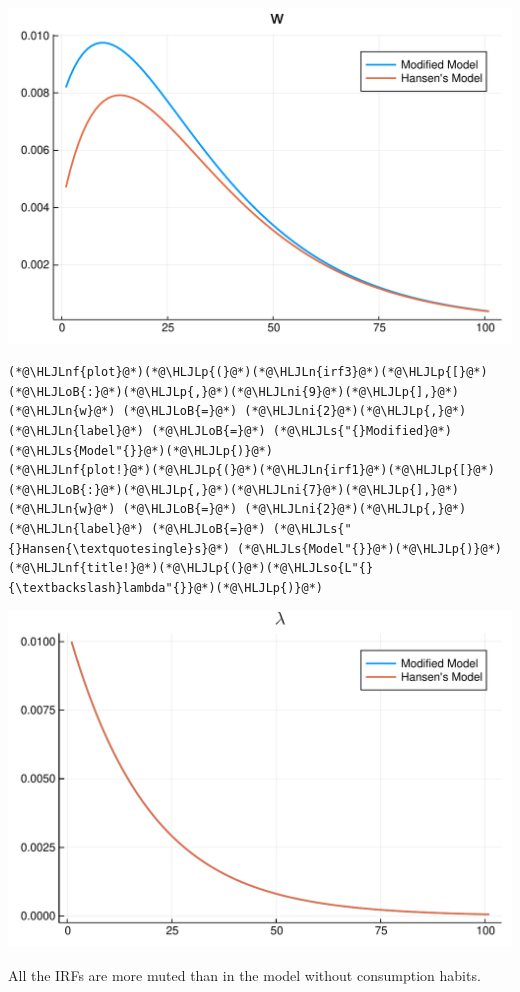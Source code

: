 \documentclass[12pt,a4paper]{article}
\newcommand{\HLJLn}[1]{#1}
\newcommand{\HLJLnf}[1]{\textcolor[RGB]{66,102,213}{#1}}
\newcommand{\HLJLs}[1]{\textcolor[RGB]{201,61,57}{#1}}
\newcommand{\HLJLso}[1]{\textcolor[RGB]{201,61,57}{#1}}
\newcommand{\HLJLni}[1]{\textcolor[RGB]{59,151,46}{#1}}
\newcommand{\HLJLoB}[1]{\textcolor[RGB]{102,102,102}{\textbf{#1}}}
\newcommand{\HLJLp}[1]{#1}
\begin{document}
\includegraphics[width=\linewidth]{figures/yvan_19_1.pdf}

\begin{lstlisting}
(*@\HLJLnf{plot}@*)(*@\HLJLp{(}@*)(*@\HLJLn{irf3}@*)(*@\HLJLp{[}@*)(*@\HLJLoB{:}@*)(*@\HLJLp{,}@*)(*@\HLJLni{9}@*)(*@\HLJLp{],}@*) (*@\HLJLn{w}@*) (*@\HLJLoB{=}@*) (*@\HLJLni{2}@*)(*@\HLJLp{,}@*) (*@\HLJLn{label}@*) (*@\HLJLoB{=}@*) (*@\HLJLs{"{}Modified}@*) (*@\HLJLs{Model"{}}@*)(*@\HLJLp{)}@*)
(*@\HLJLnf{plot!}@*)(*@\HLJLp{(}@*)(*@\HLJLn{irf1}@*)(*@\HLJLp{[}@*)(*@\HLJLoB{:}@*)(*@\HLJLp{,}@*)(*@\HLJLni{7}@*)(*@\HLJLp{],}@*) (*@\HLJLn{w}@*) (*@\HLJLoB{=}@*) (*@\HLJLni{2}@*)(*@\HLJLp{,}@*) (*@\HLJLn{label}@*) (*@\HLJLoB{=}@*) (*@\HLJLs{"{}Hansen{\textquotesingle}s}@*) (*@\HLJLs{Model"{}}@*)(*@\HLJLp{)}@*)
(*@\HLJLnf{title!}@*)(*@\HLJLp{(}@*)(*@\HLJLso{L"{}{\textbackslash}lambda"{}}@*)(*@\HLJLp{)}@*)
\end{lstlisting}

\includegraphics[width=\linewidth]{figures/yvan_20_1.pdf}

All the IRFs are more muted than in the model without consumption habits.
\end{document}
